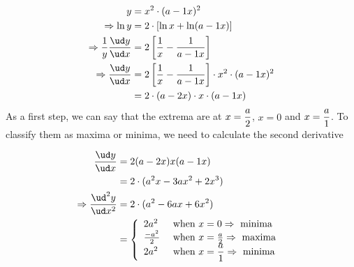 \ifprintanswers
\fi 

\begin{solution}[\fullpage]
  \begin{align}
     y &= x^2\cdot(a-\vbone x)^2 \\
     \Rightarrow \ln y &= 2\cdot \left[\ln x + \ln (a-\vbone x)\right] \\
     \Rightarrow \dfrac{1}{y}\dfrac{\ud y}{\ud x} &= 2\left[ \dfrac{1}{x} - \dfrac{\vbone}{a-\vbone x}\right] \\
     \Rightarrow \dfrac{\ud y}{\ud x} &= 2\left[ \dfrac{1}{x} - \dfrac{\vbone}{a-\vbone x}\right]
                                         \cdot x^2\cdot (a-\vbone x)^2 \\
                                      &= 2\cdot(a-\vbtwo x)\cdot x \cdot (a-\vbone x)
  \end{align}
  As a first step, we can say that the extrema are at $x=\dfrac{a}{2}$, $x=0$ and $x=\dfrac{a}{1}$.
  To classify them as maxima or minima, we need to calculate the second derivative
  
  \begin{align}
     \dfrac{\ud y}{\ud x} &= 2(a-\vbtwo x)x(a-\vbone x) \\
            &= 2\cdot(a^2x - \vbthree ax^2 + \vbsix x^3) \\
     \Rightarrow \dfrac{\ud^2 y}{\ud x^2} &= 2\cdot(a^2 - \vbfour ax + \vbfive x^2) \\
     &= \left\lbrace
        \begin{array}{l l}
          2a^2 & \text{ when } x = 0 \Rightarrow \text{ minima } \\
          \frac{-a^2}{2} & \text{ when } x = \frac{a}{\vbtwo} \Rightarrow \text{ maxima } \\
          2a^2 & \text{ when } x = \dfrac{a}{\vbone} \Rightarrow \text{ minima }
        \end{array}\right.
  \end{align}
  
\end{solution}
